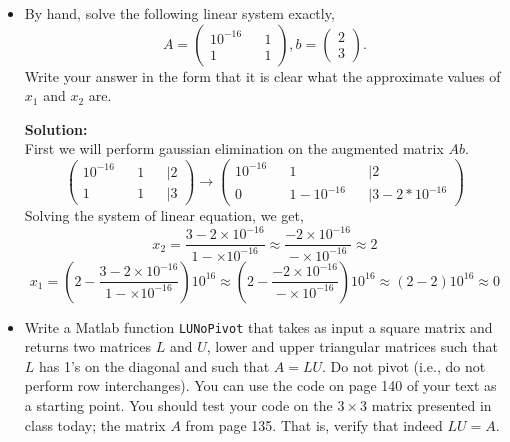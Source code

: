 \documentclass[12pt]{article}
\makeatletter
\theoremstyle{homework}
\newenvironment{exercise}[1]
{\def\@currentlabel{#1}\exercisecore}
{\endexercisecore}
\newcommand{\localhead}[1]{\par\smallskip\noindent\textbf{#1}\nobreak\\}%
\newcommand\solution{\localhead{Solution:}}
\makeatother
\begin{document}
\begin{exercise} {Problem 7.3 [Modified]} \strut

\begin{itemize}
	\item By hand, solve the following linear system exactly,
	\begin{equation*}
		A = \begin{pmatrix}
			10^{-16} && 1\\
			1 && 1
		\end{pmatrix},
		b = \begin{pmatrix}
			2\\
			3
		\end{pmatrix}.
	\end{equation*}
	Write your answer in the form that it is clear what the approximate values of $x_1$ and $x_2$ are.\\

	\solution
	First we will perform gaussian elimination on the augmented matrix $Ab$.
	\begin{equation*}
		\begin{pmatrix}
			10^{-16} && 1 &&| 2\\
			1 && 1 &&| 3
		\end{pmatrix}
		\to
		\begin{pmatrix}
			10^{-16} && 1 &&| 2\\
			0 && 1 - 10^{-16} &&| 3 - 2*10^{-16}
		\end{pmatrix}
	\end{equation*}
Solving the system of linear equation, we get,
\begin{equation*}
	x_2 = \dfrac{3 - 2\times 10^{-16}}{1 - \times 10^{-16}} \approx \dfrac{- 2\times 10^{-16}}{-\times 10^{-16}} \approx 2
\end{equation*}
\begin{equation*}
x_1 = (2 - \dfrac{3 - 2\times 10^{-16}}{1 - \times 10^{-16}})10^{16} \approx (2 - \dfrac{-2\times 10^{-16}}{-\times 10^{-16}})10^{16} \approx (2 - 2) 10^{16} \approx 0
\end{equation*}

\vspace*{.25in}



	\item Write a Matlab function {\tt LUNoPivot} that 
	takes as input a square matrix and returns two matrices $L$ and $U$,
	lower and upper triangular matrices such that $L$ has 1's
	on the diagonal and such that $A=LU$.  Do not pivot (i.e., do not perform row interchanges).  You can use the code on page 140
	of your text as a starting point. You should test your code on the 
	$3\times 3$ matrix presented in class today; the matrix $A$ from
	page 135.  That is, verify that indeed $LU=A$.


\end{itemize}
\end{exercise}
\end{document}
